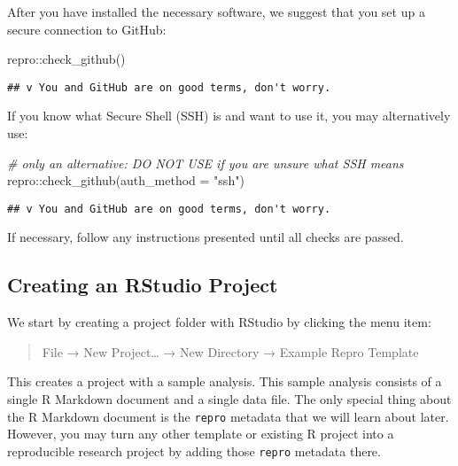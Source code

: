 \documentclass[psych,tutorial,accept,moreauthors,pdftex]{Definitions/mdpi}
\newenvironment{Shaded}{\begin{snugshade}}{\end{snugshade}}
\newcommand{\AttributeTok}[1]{\textcolor[rgb]{0.77,0.63,0.00}{#1}}
\newcommand{\CommentTok}[1]{\textcolor[rgb]{0.56,0.35,0.01}{\textit{#1}}}
\newcommand{\FunctionTok}[1]{\textcolor[rgb]{0.00,0.00,0.00}{#1}}
\newcommand{\NormalTok}[1]{#1}
\newcommand{\SpecialCharTok}[1]{\textcolor[rgb]{0.00,0.00,0.00}{#1}}
\newcommand{\StringTok}[1]{\textcolor[rgb]{0.31,0.60,0.02}{#1}}
\begin{document}
\begin{paracol}{2}
After you have installed the necessary software, we suggest that you set
up a secure connection to GitHub:

\begin{adjustwidth}{0.5cm}{0cm} 
\begin{Shaded}
\begin{Highlighting}[]
\NormalTok{repro}\SpecialCharTok{::}\FunctionTok{check\_github}\NormalTok{()}
\end{Highlighting}
\end{Shaded}

\begin{verbatim}
## v You and GitHub are on good terms, don't worry.
\end{verbatim}
\end{adjustwidth}

If you know what Secure Shell (SSH) is and want to use it, you may
alternatively use:

\begin{adjustwidth}{0.5cm}{0cm} 
\begin{Shaded}
\begin{Highlighting}[]
\CommentTok{\# only an alternative: DO NOT USE if you are unsure what SSH means}
\NormalTok{repro}\SpecialCharTok{::}\FunctionTok{check\_github}\NormalTok{(}\AttributeTok{auth\_method =} \StringTok{"ssh"}\NormalTok{)}
\end{Highlighting}
\end{Shaded}

\begin{verbatim}
## v You and GitHub are on good terms, don't worry.
\end{verbatim}
\end{adjustwidth}

If necessary, follow any instructions presented until all checks are
passed.

\subsection{Creating an RStudio
Project}\label{creating-an-rstudio-project}

We start by creating a project folder with RStudio by clicking the menu
item:

\begin{quote}
File → New Project\ldots{} → New Directory → Example Repro Template
\end{quote}

This creates a project with a sample analysis. This sample analysis
consists of a single R Markdown document and a single data file. The
only special thing about the R Markdown document is the \texttt{repro}
metadata that we will learn about later. However, you may turn any other
template or existing R project into a reproducible research project by
adding those \texttt{repro} metadata there.


\end{paracol}
\end{document}
